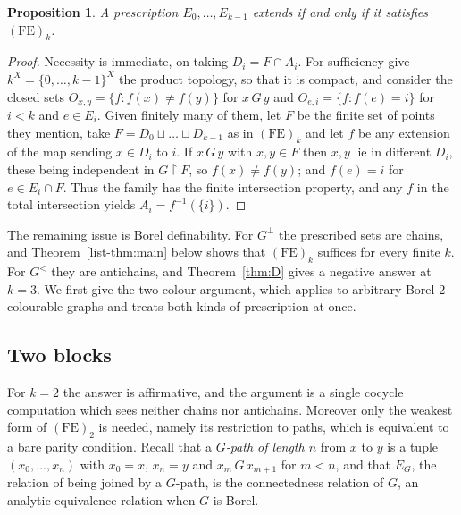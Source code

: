 \documentclass[11pt,reqno]{amsart}
\theoremstyle{plain}
\newtheorem{proposition}[theorem]{Proposition}
\theoremstyle{definition}
\theoremstyle{remark}
\newcommand{\restr}{\mathbin{\upharpoonright}}
\begin{document}
\begin{proposition}
\label{prop:compactness}
A prescription $E_0,\dots,E_{k-1}$ extends if and only if it satisfies
$\mathrm{(FE)}_k$.
\end{proposition}

\begin{proof}
Necessity is immediate, on taking $D_i=F\cap A_i$. For sufficiency give
$k^X=\{0,\dots,k-1\}^X$ the product topology, so that it is compact, and
consider the closed sets $O_{x,y}=\{f:f(x)\neq f(y)\}$ for $x\,G\,y$ and
$O_{e,i}=\{f:f(e)=i\}$ for $i<k$ and $e\in E_i$. Given finitely many of them,
let $F$ be the finite set of points they mention, take
$F=D_0\sqcup\dots\sqcup D_{k-1}$ as in $\mathrm{(FE)}_k$ and let $f$ be any
extension of the map sending $x\in D_i$ to $i$. If $x\,G\,y$ with $x,y\in F$
then $x,y$ lie in different $D_i$, these being independent in $G\restr F$, so
$f(x)\neq f(y)$; and $f(e)=i$ for $e\in E_i\cap F$. Thus the family has the
finite intersection property, and any $f$ in the total intersection yields
$A_i=f^{-1}(\{i\})$.
\end{proof}

The remaining issue is Borel definability. For $G^{\perp}$ the prescribed
sets are chains, and Theorem~\ref{list-thm:main} below shows that
$\mathrm{(FE)}_k$ suffices for every finite $k$. For $G^{<}$ they are
antichains, and Theorem~\ref{thm:D} gives a negative answer at $k=3$.
We first give the two-colour argument, which applies to arbitrary Borel
$2$-colourable graphs and treats both kinds of prescription at once.

\subsection{Two blocks}
\label{subsec:two}

For $k=2$ the answer is affirmative, and the argument is a single cocycle
computation which sees neither chains nor antichains. Moreover only the weakest
form of $\mathrm{(FE)}_2$ is needed, namely its restriction to paths, which is
equivalent to a bare parity condition. Recall that a \emph{$G$-path of length
$n$} from $x$ to $y$ is a tuple $(x_0,\dots,x_n)$ with $x_0=x$, $x_n=y$ and
$x_m\,G\,x_{m+1}$ for $m<n$, and that $E_G$, the relation of being joined by a
$G$-path, is the connectedness relation of $G$, an analytic equivalence relation
when $G$ is Borel.
\end{document}

